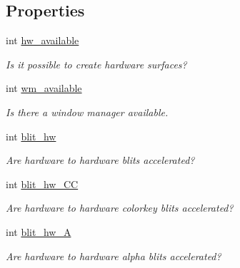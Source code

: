 \subsection*{Properties}
\begin{DoxyCompactItemize}
\item 
int \hyperlink{struct_s_d_l___video_info_a9e3e927ca8f916e256e6e15ded8a2208}{hw\_\-available}
\begin{DoxyCompactList}\small\item\em Is it possible to create hardware surfaces? \item\end{DoxyCompactList}\item 
int \hyperlink{struct_s_d_l___video_info_a1a0d117972bfc104ac9f70becb224b76}{wm\_\-available}
\begin{DoxyCompactList}\small\item\em Is there a window manager available. \item\end{DoxyCompactList}\item 
int \hyperlink{struct_s_d_l___video_info_a87b8c2835494b2525890b17363d312b3}{blit\_\-hw}
\begin{DoxyCompactList}\small\item\em Are hardware to hardware blits accelerated? \item\end{DoxyCompactList}\item 
int \hyperlink{struct_s_d_l___video_info_a7d3127063b8bcf4efa255e7c9f542dec}{blit\_\-hw\_\-CC}
\begin{DoxyCompactList}\small\item\em Are hardware to hardware colorkey blits accelerated? \item\end{DoxyCompactList}\item 
int \hyperlink{struct_s_d_l___video_info_a5ce254b40d69f53b1cc895a6a76fd714}{blit\_\-hw\_\-A}
\begin{DoxyCompactList}\small\item\em Are hardware to hardware alpha blits accelerated? \item\end{DoxyCompactList}\item 

\end{DoxyCompactItemize}
